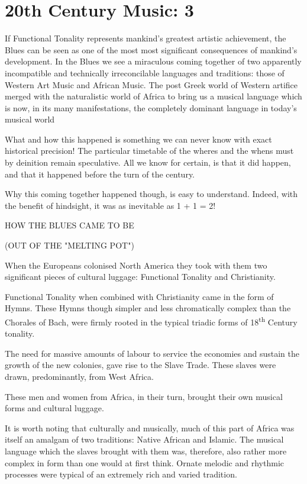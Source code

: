 \documentclass{article}
\begin{document}
\pagebreak
\section{20th Century Music: 3}

If Functional Tonality represents mankind's greatest artistic achievement, the Blues can be seen as one of the most most significant consequences of mankind's development.
In the Blues we see a miraculous coming together of two apparently incompatible and technically irreconcilable languages and traditions: those of Western Art Music and African Music.
The post Greek world of Western artifice merged with the naturalistic world of Africa to bring us a musical language which is now, in its many manifestations, the completely dominant language in today's musical world

What and how this happened is something we can never know with exact historical precision!
The particular timetable of the wheres and the whens must by deinition remain speculative.
All we know for certain, is that it did happen, and that it happened before the turn of the century.

Why this coming together happened though, is easy to understand.
Indeed, with the benefit of hindsight, it was as inevitable as 1 + 1 = 2!

HOW THE BLUES CAME TO BE

(OUT OF THE "MELTING POT")

When the Europeans colonised North America they took with them two significant pieces of cultural luggage: Functional Tonality and Christianity.

Functional Tonality when combined with Christianity came in the form of Hymns.
These Hymns though simpler and  less chromatically complex than the Chorales of Bach, were firmly rooted in the typical triadic forms of 18\textsuperscript{th} Century tonality.

The need for massive amounts of labour to service the economies and sustain the growth of the new colonies, gave rise to the Slave Trade.
These slaves were drawn, predominantly, from West Africa.

These men and women from Africa, in their turn, brought their own musical forms and cultural luggage.

It is worth noting that culturally and musically, much of this part of Africa was itself an amalgam of two traditions: Native African and Islamic.
The musical language which the slaves brought with them was, therefore, also rather more complex in form than one would at first think.
Ornate melodic and rhythmic processes were typical of an extremely rich and varied tradition.
\end{document}
